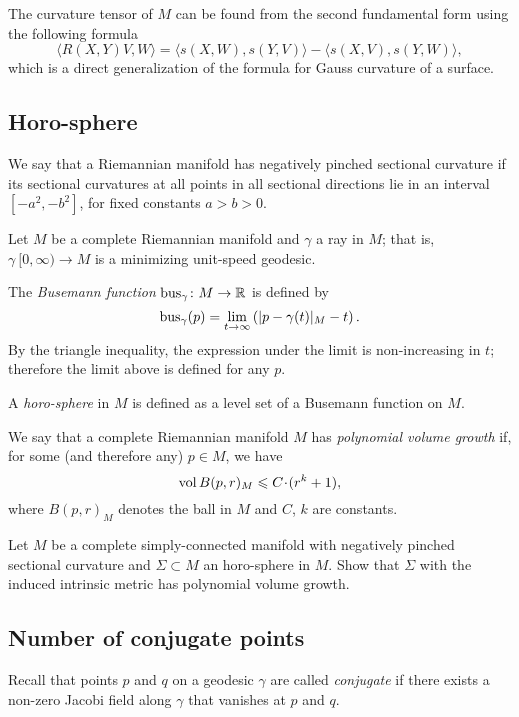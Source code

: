 The curvature tensor of $M$ can be found from the second fundamental form using the following  formula
\[\langle R(X,Y)V,W\rangle=\langle s(X,W),s(Y,V)\rangle-\langle s(X,V),s(Y,W)\rangle,\]
which is a direct generalization of the formula for Gauss curvature of a surface.


\subsection*{Horo-sphere}
\label{Horosphere}

We say that a Riemannian manifold has negatively pinched sectional curvature if its sectional curvatures at all points in all sectional directions lie in an interval $[-a^2, -b^2]$, for fixed constants $a>b>0$.

Let $M$ be a complete Riemannian manifold
and $\gamma$ a ray in $M$; 
that is, $\gamma\:[0, \infty)\to M$ is a minimizing unit-speed geodesic.

The \label{page:Busemann function}\emph{Busemann function} $\operatorname{\rm bus}\nolimits_\gamma\colon M\to\mathbb{R}$ is defined by
$$\operatorname{\rm bus}\nolimits_\gamma(p)=\lim_{t\to\infty}\left(|p-\gamma(t)|_M-t\right).$$
By the triangle inequality, 
the expression under the limit is non-increasing in $t$; 
therefore  the limit above is defined for any $p$.

A \emph{horo-sphere} in $M$ is defined as a level set of a Busemann function
on $M$.

We say that a complete Riemannian manifold $M$ has \emph{polynomial volume growth} if, for some (and therefore any) $p\in M$, we have 
$$\vol B(p,r)_M\z\le C\cdot (r^k+1),$$ 
where $B(p,r)_M$ denotes the ball in $M$ and  $C$, $k$ are constants.

\begin{pr} Let $M$ be a complete simply-connected manifold with negatively pinched sectional curvature
and $\Sigma\subset M$ an horo-sphere in $M$.
Show that
$\Sigma$ with the induced intrinsic metric 
has polynomial volume growth.
\end{pr}

\subsection*{Number of conjugate points}
\label{Number of conjugate points}

Recall that points $p$ and $q$ on a geodesic $\gamma$ are called \emph{conjugate} if there exists a non-zero Jacobi field along $\gamma$ that vanishes at $p$ and $q$. 

